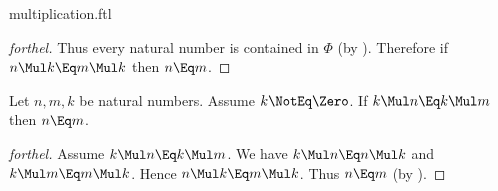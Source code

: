 \documentclass{stex}
\begin{document}
\begin{smodule}{multiplication.ftl}
\begin{proof}[forthel]
  Thus every natural number is contained in $\Phi$ (by ).
  Therefore if $n \Mul k \Eq m \Mul k$ then $n \Eq m$.
\end{proof}

\begin{proposition*}[forthel,name=left-cancellability of multiplication]
  Let $n, m, k$ be natural numbers.
  Assume $k \NotEq \Zero$.
  If $k \Mul n \Eq k \Mul m$ then $n \Eq m$.
\end{proposition*}
\begin{proof}[forthel]
  Assume $k \Mul n \Eq k \Mul m$.
  We have $k \Mul n \Eq n \Mul k$ and $k \Mul m \Eq m \Mul k$.
  Hence $n \Mul k \Eq m \Mul k$.
  Thus $n \Eq m$ (by ).
\end{proof}

\end{smodule}
\end{document}

